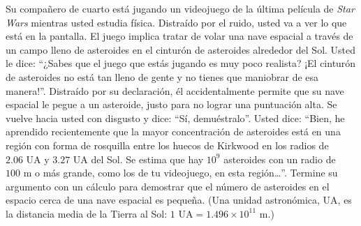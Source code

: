 \item Su compañero de cuarto está jugando un videojuego de la última película de \textit{Star Wars} mientras usted estudia física. Distraído por el ruido, usted va a ver lo que está en la pantalla. El juego implica tratar de volar una nave espacial a través de un campo lleno de asteroides en el cinturón de asteroides alrededor del Sol. Usted le dice: ``¿Sabes que el juego que estás jugando es muy poco realista? ¡El cinturón de asteroides no está tan lleno de gente y no tienes que maniobrar de esa manera!''. Distraído por su declaración, él accidentalmente permite que su nave espacial le pegue a un asteroide, justo para no lograr una puntuación alta. Se vuelve hacia usted con disgusto y dice: ``Sí, demuéstralo''. Usted dice: ``Bien, he aprendido recientemente que la mayor concentración de asteroides está en una región con forma de rosquilla entre los huecos de Kirkwood en los radios de $2.06 \text{ UA}$ y $3.27 \text{ UA}$ del Sol. Se estima que hay $10^9$ asteroides con un radio de $100 \text{ m}$ o más grande, como los de tu videojuego, en esta región\dots''. Termine su argumento con un cálculo para demostrar que el número de asteroides en el espacio cerca de una nave espacial es pequeña. (Una unidad astronómica, UA, es la distancia media de la Tierra al Sol: $1 \text{ UA} = 1.496 \times 10^{11} \text{ m}$.)
